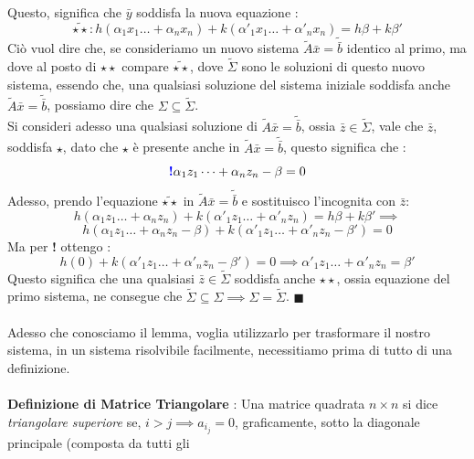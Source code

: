 \documentclass[12pt, letterpaper]{article}
\newcommand{\acc}{\\\hphantom{}\\}
\begin{document}
Questo, significa che \(\bar y\) soddisfa la nuova equazione : \begin{equation}
    \tilde{\star\star} : h(\alpha_1x_1\dots+\alpha_nx_n)+k(\alpha'_1x_1\dots+\alpha'_nx_n)=h\beta+k\beta'
\end{equation}
Ciò vuol dire che, se consideriamo un nuovo sistema \(\tilde A\bar x = \tilde{\bar b}\) identico al primo, ma dove 
al posto di \(\star\star\) compare \(\tilde{\star\star}\), dove \(\tilde\Sigma\) sono le soluzioni di questo nuovo 
sistema, essendo che, una qualsiasi soluzione del sistema 
iniziale  soddisfa anche \(\tilde A\bar x = \tilde{\bar b}\), possiamo dire che \(\Sigma\subseteq\tilde\Sigma\).\\
Si consideri adesso una qualsiasi soluzione di \(\tilde A\bar x = \tilde{\bar b}\), ossia \(\bar z \in \tilde\Sigma\), vale 
che \(\bar z\), soddisfa \(\star\), dato che \(\star\) è presente anche in \(\tilde A\bar x = \tilde{\bar b}\), questo 
significa che : \begin{equation}
    \text{\color{blue}\textbf{!}\color{black} }\alpha_1z_1\dots+\alpha_nz_n-\beta=0
\end{equation}
Adesso, prendo l'equazione \(\tilde{\star\star}\) in \(\tilde A\bar x = \tilde{\bar b}\) e sostituisco l'incognita con \(\bar z\):
\begin{equation}
    h(\alpha_1z_1\dots+\alpha_nz_n)+k(\alpha'_1z_1\dots+\alpha'_nz_n)=h\beta+k\beta'\implies
\end{equation}
\begin{equation}
    h(\alpha_1z_1\dots+\alpha_nz_n-\beta)+k(\alpha'_1z_1\dots+\alpha'_nz_n-\beta')=0
\end{equation}
Ma per \color{blue}\textbf{! }\color{black} ottengo : 
\begin{equation}
    h(0)+k(\alpha'_1z_1\dots+\alpha'_nz_n-\beta')=0\implies \alpha'_1z_1\dots+\alpha'_nz_n=\beta'
\end{equation}
Questo significa che una qualsiasi \(\bar z\in \tilde\Sigma\) soddisfa anche \(\star\star\), ossia equazione del primo sistema, 
ne consegue che \(\tilde\Sigma\subseteq\Sigma\implies \Sigma=\tilde\Sigma\). \(\blacksquare\)\acc
Adesso che conosciamo il lemma, voglia utilizzarlo per trasformare il nostro sistema, in un sistema risolvibile 
facilmente, necessitiamo prima di tutto di una definizione. \acc 
\textbf{Definizione di Matrice Triangolare }: Una matrice quadrata \(n\times n\) si dice \textit{triangolare 
superiore} se, \(i>j\implies a_{i_j}=0\), graficamente, sotto la diagonale principale (composta da tutti gli 
\end{document}
